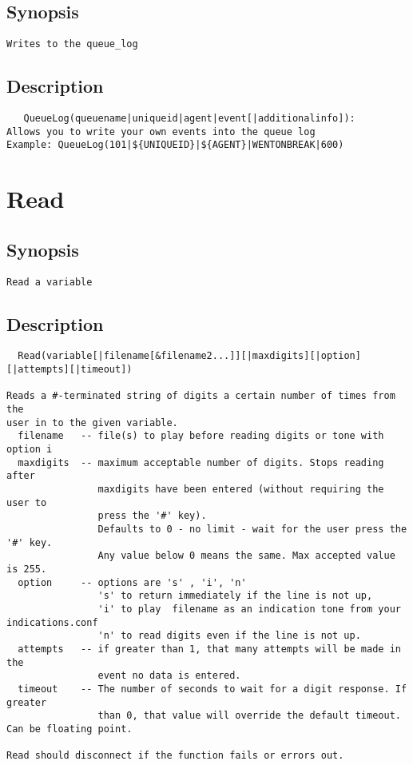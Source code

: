 \subsection{Synopsis}
\begin{verbatim}
Writes to the queue_log
\end{verbatim}
\subsection{Description}
\begin{verbatim}
   QueueLog(queuename|uniqueid|agent|event[|additionalinfo]):
Allows you to write your own events into the queue log
Example: QueueLog(101|${UNIQUEID}|${AGENT}|WENTONBREAK|600)

\end{verbatim}


\section{Read}
\subsection{Synopsis}
\begin{verbatim}
Read a variable
\end{verbatim}
\subsection{Description}
\begin{verbatim}
  Read(variable[|filename[&filename2...]][|maxdigits][|option][|attempts][|timeout])

Reads a #-terminated string of digits a certain number of times from the
user in to the given variable.
  filename   -- file(s) to play before reading digits or tone with option i
  maxdigits  -- maximum acceptable number of digits. Stops reading after
                maxdigits have been entered (without requiring the user to
                press the '#' key).
                Defaults to 0 - no limit - wait for the user press the '#' key.
                Any value below 0 means the same. Max accepted value is 255.
  option     -- options are 's' , 'i', 'n'
                's' to return immediately if the line is not up,
                'i' to play  filename as an indication tone from your indications.conf
                'n' to read digits even if the line is not up.
  attempts   -- if greater than 1, that many attempts will be made in the 
                event no data is entered.
  timeout    -- The number of seconds to wait for a digit response. If greater
                than 0, that value will override the default timeout. Can be floating point.

Read should disconnect if the function fails or errors out.

\end{verbatim}


